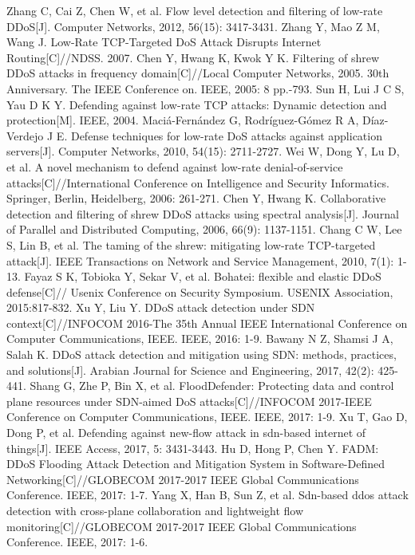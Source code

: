 \documentclass[conference]{IEEEtran}
\begin{document}
\begin{thebibliography}{00}
 Zhang C, Cai Z, Chen W, et al. Flow level detection and filtering of low-rate DDoS[J]. Computer Networks, 2012, 56(15): 3417-3431.
 Zhang Y, Mao Z M, Wang J. Low-Rate TCP-Targeted DoS Attack Disrupts Internet Routing[C]//NDSS. 2007.
 Chen Y, Hwang K, Kwok Y K. Filtering of shrew DDoS attacks in frequency domain[C]//Local Computer Networks, 2005. 30th Anniversary. The IEEE Conference on. IEEE, 2005: 8 pp.-793.
 Sun H, Lui J C S, Yau D K Y. Defending against low-rate TCP attacks: Dynamic detection and protection[M]. IEEE, 2004.
 Maciá-Fernández G, Rodríguez-Gómez R A, Díaz-Verdejo J E. Defense techniques for low-rate DoS attacks against application servers[J]. Computer Networks, 2010, 54(15): 2711-2727.
 Wei W, Dong Y, Lu D, et al. A novel mechanism to defend against low-rate denial-of-service attacks[C]//International Conference on Intelligence and Security Informatics. Springer, Berlin, Heidelberg, 2006: 261-271.
 Chen Y, Hwang K. Collaborative detection and filtering of shrew DDoS attacks using spectral analysis[J]. Journal of Parallel and Distributed Computing, 2006, 66(9): 1137-1151.
 Chang C W, Lee S, Lin B, et al. The taming of the shrew: mitigating low-rate TCP-targeted attack[J]. IEEE Transactions on Network and Service Management, 2010, 7(1): 1-13.
 Fayaz S K, Tobioka Y, Sekar V, et al. Bohatei: flexible and elastic DDoS defense[C]// Usenix Conference on Security Symposium. USENIX Association, 2015:817-832.
 Xu Y, Liu Y. DDoS attack detection under SDN context[C]//INFOCOM 2016-The 35th Annual IEEE International Conference on Computer Communications, IEEE. IEEE, 2016: 1-9.
 Bawany N Z, Shamsi J A, Salah K. DDoS attack detection and mitigation using SDN: methods, practices, and solutions[J]. Arabian Journal for Science and Engineering, 2017, 42(2): 425-441.
 Shang G, Zhe P, Bin X, et al. FloodDefender: Protecting data and control plane resources under SDN-aimed DoS attacks[C]//INFOCOM 2017-IEEE Conference on Computer Communications, IEEE. IEEE, 2017: 1-9.
 Xu T, Gao D, Dong P, et al. Defending against new-flow attack in sdn-based internet of things[J]. IEEE Access, 2017, 5: 3431-3443.
 Hu D, Hong P, Chen Y. FADM: DDoS Flooding Attack Detection and Mitigation System in Software-Defined Networking[C]//GLOBECOM 2017-2017 IEEE Global Communications Conference. IEEE, 2017: 1-7.
 Yang X, Han B, Sun Z, et al. Sdn-based ddos attack detection with cross-plane collaboration and lightweight flow monitoring[C]//GLOBECOM 2017-2017 IEEE Global Communications Conference. IEEE, 2017: 1-6.

\end{thebibliography}
\end{document}
